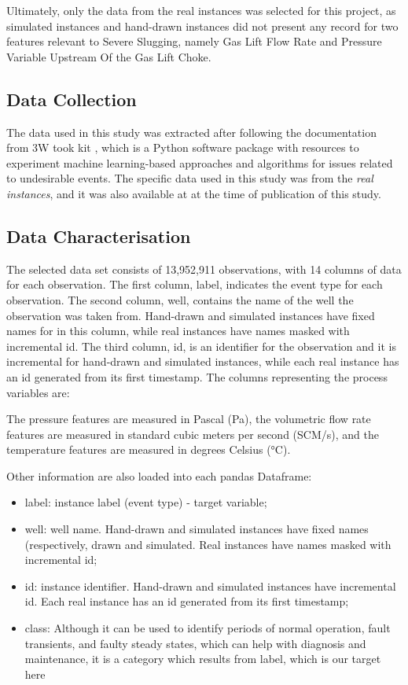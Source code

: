 \documentclass{article}
\begin{document}
Ultimately, only the data from the real instances was selected for this project, as simulated instances and hand-drawn instances did not present any record for two features relevant to Severe Slugging, namely Gas Lift Flow Rate and Pressure Variable Upstream Of the Gas Lift Choke.

\subsection{Data Collection}
The data used in this study was extracted after following the documentation from 3W took kit \parencite{petrobras3WToolkit}, which is a Python software package with resources to experiment machine learning-based approaches and algorithms for issues related to undesirable events. The specific data used in this study was from the \emph{real instances}, and it was also available at \textcite{extracted3Wcsv} at the time of publication of this study.

\subsection{Data Characterisation}

The selected data set consists of 13,952,911 observations, with 14 columns of data for each observation. The first column, label, indicates the event type for each observation. The second column, well, contains the name of the well the observation was taken from. Hand-drawn and simulated instances have fixed names for in this column, while real instances have names masked with incremental id. The third column, id, is an identifier for the observation and it is incremental for hand-drawn and simulated instances, while each real instance has an id generated from its first timestamp. The columns representing the process variables are:



The pressure features are measured in Pascal (Pa), the volumetric flow rate features are measured in standard cubic meters per second (SCM/s), and the temperature features are measured in degrees Celsius (°C).

Other information are also loaded into each pandas Dataframe:

\begin{itemize}
\item label: instance label (event type) - target variable;
\item well: well name. Hand-drawn and simulated instances have fixed names (respectively, drawn and simulated. Real instances have names masked with incremental id;
\item id: instance identifier. Hand-drawn and simulated instances have incremental id. Each real instance has an id generated from its first timestamp;
\item class: Although it can be used to identify periods of normal operation, fault transients, and faulty steady states, which can help with diagnosis and maintenance, it is a category which results from label, which is our target here
\end{itemize}
\end{document}
